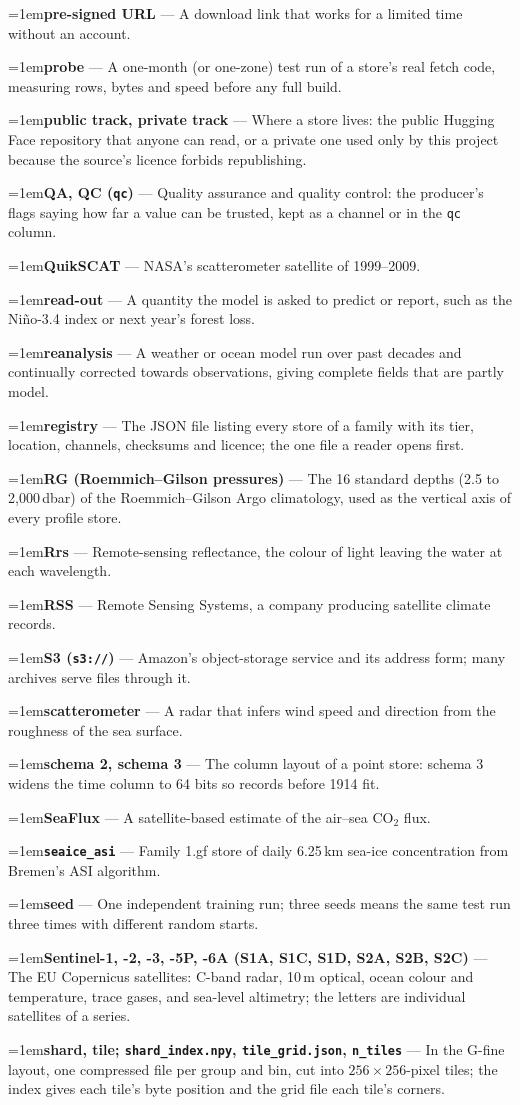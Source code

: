 \documentclass[10pt]{article}
\newcommand{\code}[1]{\texttt{#1}}
\newcommand{\gl}[2]{\par\hangindent=1em\hangafter=1\textbf{#1} --- #2\par}
\begin{document}
\gl{pre-signed URL}{A download link that works for a limited time without an account.}
\gl{probe}{A one-month (or one-zone) test run of a store's real fetch code, measuring rows, bytes and speed before any full build.}
\gl{public track, private track}{Where a store lives: the public Hugging Face repository that anyone can read, or a private one used only by this project because the source's licence forbids republishing.}
\gl{QA, QC (\code{qc})}{Quality assurance and quality control: the producer's flags saying how far a value can be trusted, kept as a channel or in the \code{qc} column.}
\gl{QuikSCAT}{NASA's scatterometer satellite of 1999--2009.}
\gl{read-out}{A quantity the model is asked to predict or report, such as the Ni\~no-3.4 index or next year's forest loss.}
\gl{reanalysis}{A weather or ocean model run over past decades and continually corrected towards observations, giving complete fields that are partly model.}
\gl{registry}{The JSON file listing every store of a family with its tier, location, channels, checksums and licence; the one file a reader opens first.}
\gl{RG (Roemmich--Gilson pressures)}{The 16 standard depths (2.5 to 2,000\,dbar) of the Roemmich--Gilson Argo climatology, used as the vertical axis of every profile store.}
\gl{Rrs}{Remote-sensing reflectance, the colour of light leaving the water at each wavelength.}
\gl{RSS}{Remote Sensing Systems, a company producing satellite climate records.}
\gl{S3 (\code{s3://})}{Amazon's object-storage service and its address form; many archives serve files through it.}
\gl{scatterometer}{A radar that infers wind speed and direction from the roughness of the sea surface.}
\gl{schema 2, schema 3}{The column layout of a point store: schema 3 widens the time column to 64 bits so records before 1914 fit.}
\gl{SeaFlux}{A satellite-based estimate of the air--sea CO$_2$ flux.}
\gl{\code{seaice\_asi}}{Family 1.gf store of daily 6.25\,km sea-ice concentration from Bremen's ASI algorithm.}
\gl{seed}{One independent training run; three seeds means the same test run three times with different random starts.}
\gl{Sentinel-1, -2, -3, -5P, -6A (S1A, S1C, S1D, S2A, S2B, S2C)}{The EU Copernicus satellites: C-band radar, 10\,m optical, ocean colour and temperature, trace gases, and sea-level altimetry; the letters are individual satellites of a series.}
\gl{shard, tile; \code{shard\_index.npy}, \code{tile\_grid.json}, \code{n\_tiles}}{In the G-fine layout, one compressed file per group and bin, cut into $256 \times 256$-pixel tiles; the index gives each tile's byte position and the grid file each tile's corners.}
\end{document}
